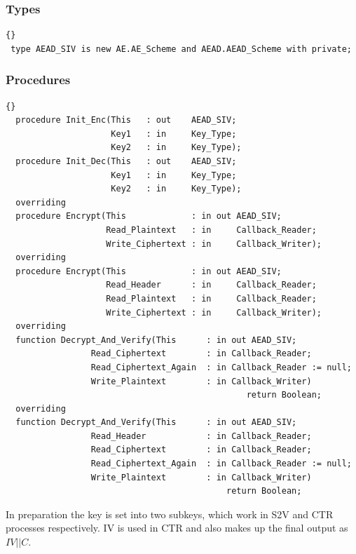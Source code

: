 \subsubsection*{Types}
\begin{lstlisting}{}
 type AEAD_SIV is new AE.AE_Scheme and AEAD.AEAD_Scheme with private;
\end{lstlisting}

\subsubsection*{Procedures}
\begin{lstlisting}{}
  procedure Init_Enc(This   : out    AEAD_SIV;
                     Key1   : in     Key_Type;
                     Key2   : in     Key_Type);
  procedure Init_Dec(This   : out    AEAD_SIV;
                     Key1   : in     Key_Type;
                     Key2   : in     Key_Type);
  overriding
  procedure Encrypt(This             : in out AEAD_SIV;
                    Read_Plaintext   : in     Callback_Reader;
                    Write_Ciphertext : in     Callback_Writer);
  overriding
  procedure Encrypt(This             : in out AEAD_SIV;
                    Read_Header      : in     Callback_Reader;
                    Read_Plaintext   : in     Callback_Reader;
                    Write_Ciphertext : in     Callback_Writer);
  overriding
  function Decrypt_And_Verify(This      : in out AEAD_SIV;
                 Read_Ciphertext        : in Callback_Reader;
                 Read_Ciphertext_Again  : in Callback_Reader := null;
                 Write_Plaintext        : in Callback_Writer)
                     							return Boolean;
  overriding
  function Decrypt_And_Verify(This      : in out AEAD_SIV;
                 Read_Header            : in Callback_Reader;
                 Read_Ciphertext        : in Callback_Reader;
                 Read_Ciphertext_Again  : in Callback_Reader := null;
                 Write_Plaintext        : in Callback_Writer)
                               				return Boolean;
\end{lstlisting}
In preparation the key is set into two subkeys, which work in S2V and
CTR processes respectively. IV is used in CTR and also makes up the
final output as $IV||C$.


